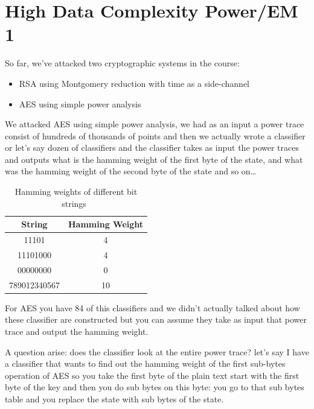 \chapter{High Data Complexity Power/EM 1} \label{cha:High Data Complexity Power/EM 1}

So far, we've attacked two cryptographic systems in the course:
\begin{itemize}
    \item RSA using Montgomery reduction with time as a side-channel
    \item AES using simple power analysis
\end{itemize}

We attacked AES using simple power analysis, we had as an input a power trace consist of hundreds of thousands of points and then we actually wrote a classifier or let's say dozen of classifiers and the classifier takes as input the power traces and outputs what is the hamming weight of the first byte of the state, and what was the hamming weight of the second byte of the state and so on\ldots

\begin{table}
    \caption{Hamming weights of different bit strings~\cite{hamming}}\label{hammingWeights}
    \begin{center}
    \begin{tabular}{ cc }
        \toprule
        String & Hamming Weight \\ 
        \midrule
        11101 & 4 \\ 
        11101000 & 4 \\
        00000000 & 0 \\
        789012340567 & 10 \\
        \bottomrule
    \end{tabular}
    \end{center}
\end{table}

For AES you have 84 of this classifiers and we didn't actually talked about how these classifier are constructed but you can assume they take as input that power trace and output the hamming weight. 

A question arise: does the classifier look at the entire power trace? let's say I have a classifier that wants to find out the hamming weight of the first sub-bytes operation of AES so you take the first byte of the plain text start with the first byte of the key and then you do sub bytes on this byte: you go to that sub bytes table and you replace the state with sub bytes of the state. 

